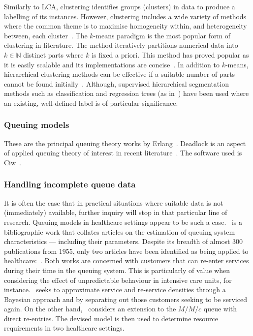 Similarly to LCA, clustering identifies groups (clusters) in data to produce a
labelling of its instances. However, clustering includes a wide variety of
methods where the common theme is to maximise homogeneity within, and
heterogeneity between, each cluster~\cite{Everitt2011}. The \(k\)-means paradigm
is the most popular form of clustering in literature. The method iteratively
partitions numerical data into \(k \in \mathbb{N}\) distinct parts where \(k\)
is fixed a priori. This method has proved popular as it is easily scalable and
its implementations are concise~\cite{Olafsson2008,Wu2009}. In addition to
\(k\)-means, hierarchical clustering methods can be effective if a suitable
number of parts cannot be found initially~\cite{Vuik2016a}. Although, supervised
hierarchical segmentation methods such as classification and regression trees
(as in~\cite{Harper2006}) have been used where an existing, well-defined label
is of particular significance.

\subsubsection{Queuing models}

These are the principal queuing theory works by
Erlang~\cite{Erlang1917,Erlang1920}. Deadlock is an aspect of applied queuing
theory of interest in recent literature~\cite{Palmer2018}. The software used is
Ciw~\cite{Palmer2019}.  %

\subsubsection{Handling incomplete queue data}

It is often the case that in practical situations where suitable data is not
(immediately) available, further inquiry will stop in that particular line of
research. Queuing models in healthcare settings appear to be such a
case.~\cite{Asanjarani2017} is a bibliographic work that collates articles on
the estimation of queuing system characteristics --- including their parameters.
Despite its breadth of almost 300 publications from 1955, only two articles have
been identified as being applied to healthcare:~\cite{Mohammadi2012,Yom2014}.
Both works are concerned with customers that can re-enter services during their
time in the queuing system. This is particularly of value when considering the
effect of unpredictable behaviour in intensive care units, for
instance.~\cite{Mohammadi2012} seeks to approximate service and re-service
densities through a Bayesian approach and by separating out those customers
seeking to be serviced again. On the other hand,~\cite{Yom2014} considers an
extension to the \(M/M/c\) queue with direct re-entries. The devised model is
then used to determine resource requirements in two healthcare settings.

